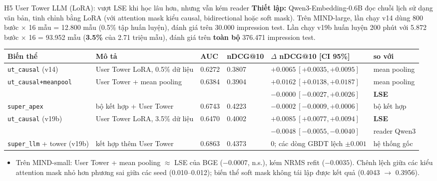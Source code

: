 \documentclass[aspectratio=169,t]{beamer}
\newcommand{\code}[1]{\texttt{#1}}
\begin{document}
\begin{frame}[shrink]{H5 \textperiodcentered{} User Tower LLM (LoRA): vượt LSE khi học lâu hơn, nhưng vẫn kém reader}
\scriptsize
\textbf{Thiết lập:} Qwen3-Embedding-0.6B đọc chuỗi lịch sử dạng văn bản, tinh chỉnh bằng LoRA (với attention mask kiểu causal, bidirectional hoặc soft mask).
Trên MIND-large, lần chạy v14 dùng 800 bước $\times$ 16 mẫu = 12.800 mẫu (0.5\% tập huấn luyện), đánh giá trên 30.000 impression test.
Lần chạy v19b huấn luyện 200 phút với 5.872 bước $\times$ 16 = 93.952 mẫu (\textbf{3.5\%} của 2.71 triệu mẫu), đánh giá trên \textbf{toàn bộ} 376.471 impression test.\par\vspace{3pt}
\renewcommand{\arraystretch}{1.07}
\setlength{\tabcolsep}{4pt}
\begin{tabularx}{\textwidth}{@{}P{2.8cm}YQ{0.95cm}Q{1.32cm}P{3.65cm}P{1.75cm}@{}}
\toprule
\textbf{Biến thể} & \textbf{Mô tả} & \textbf{AUC} & \textbf{nDCG@10} & \textbf{$\Delta$ nDCG@10 [CI 95\%]} & \textbf{so với}\\
\midrule
\code{ut\_causal} (v14) & User Tower LoRA, 0.5\% dữ liệu & 0.6272 & 0.3807 & $+0.0065\ [+0.0035, +0.0095]$ & mean pooling\\
\code{ut\_causal+meanpool} & User Tower + mean pooling & 0.6384 & 0.3904 & $+0.0162\ [+0.0138, +0.0187]$ & mean pooling\\
 & & & & $-0.0000\ [-0.0027, +0.0026]$ & \textbf{LSE}\\
\code{super\_apex} & bộ kết hợp + User Tower & 0.6743 & 0.4223 & $-0.0002\ [-0.0009, +0.0006]$ & bộ kết hợp\\
\midrule
\code{ut\_causal} (v19b) & User Tower LoRA, 3.5\% dữ liệu & 0.6470 & 0.4002 & $\mathbf{+0.0085}\ [+0.0077, +0.0094]$ & \textbf{LSE}\\
 & & & & $-0.0048\ [-0.0055, -0.0040]$ & reader Qwen3\\
\code{super\_llm} + tower (v19b) & kết hợp thêm User Tower & 0.6863 & 0.4373 & $0$; các dòng GBDT lệch $\pm0.001$ & hệ thống gốc\\
\bottomrule
\end{tabularx}
\begin{itemize}
  \setlength{\itemsep}{1pt}
  \item Trên MIND-small: User Tower + mean pooling $\approx$ LSE của BGE ($-0.0007$, n.s.), kém NRMS refit ($-0.0035$). Chênh lệch giữa các kiểu attention mask nhỏ hơn phương sai giữa các seed (0.010--0.012); biến thể soft mask không tái lập được kết quả (0.4043 $\to$ 0.3956).

\end{itemize}
\end{frame}
\end{document}
